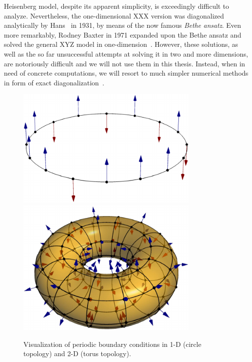 Heisenberg model, despite its apparent simplicity, is exceedingly difficult to analyze.
Nevertheless, the one-dimensional XXX version was diagonalized analytically by Hans~\textcite{Bethe1931} 
in 1931, by means of the now famous \textit{Bethe ansatz}. Even more remarkably, Rodney Baxter in
1971 expanded upon the Bethe ansatz and solved the general XYZ model in 
one-dimension~\autocite{Baxter1971,Baxter1972}. However, these solutions, as well as the
so far unsuccessful attempts at solving it in two and more dimensions, are notoriously difficult and
we will not use them in this thesis. Instead, when in need of concrete computations, we will
resort to much simpler numerical methods in form of exact diagonalization~\autocite{Lin1990}.

\begin{figure}[htbp]
    \centering
    \includegraphics[width=0.8\textwidth]{Figures/ring.pdf}
    \includegraphics[width=0.8\textwidth]{Figures/torus.pdf}
    \caption{Visualization of periodic boundary conditions in 1-D (circle topology) and
    2-D (torus topology).}
    \label{fig:pbc}
\end{figure}

